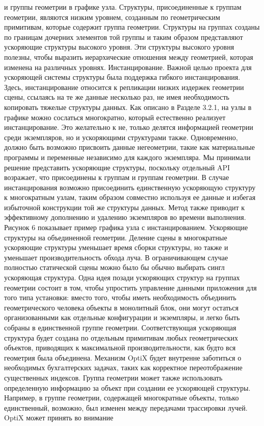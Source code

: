 и группы геометрии в графике узла. Структуры, присоединенные к группам геометрии, являются низким уровнем, созданным по геометрическим примитивам, которые содержит группа геометрии. Структуры на группах созданы по границам дочерних элементов той группы и таким образом представляют ускоряющие структуры высокого уровня. Эти структуры высокого уровня полезны, чтобы выразить иерархические отношения между геометрией, которая изменена на различных уровнях. Инстанцирование. Важной целью проекта для ускоряющей системы структуры была поддержка гибкого инстанцирования. Здесь, инстанцирование относится к репликации низких издержек геометрии сцены, ссылаясь на те же данные несколько раз, не имея необходимость копировать тяжелые структуры данных. Как описано в Разделе 3.2.1, на узлы в графике можно сослаться многократно, который естественно реализует инстанцирование. Это желательно к не, только делятся информацией геометрии среди экземпляров, но и ускоряющими структурами также. Одновременно, должно быть возможно присвоить данные негеометрии, такие как материальные программы и переменные независимо для каждого экземпляра. Мы принимали решение представить ускоряющие структуры, поскольку отдельный API возражает, что присоединены к группам и группам геометрии. В случае инстанцирования возможно присоединить единственную ускоряющую структуру к многократным узлам, таким образом совместно используя ее данные и избегая избыточной конструкции той же структуры данных. Метод также приводит к эффективному дополнению и удалению экземпляров во времени выполнения. Рисунок 6 показывает пример графика узла с инстанцированием.
Ускоряющие структуры на объединенной геометрии. Деление сцены в многократные ускоряющие структуры уменьшает время сборки структуры, но также и уменьшает производительность обхода луча. В ограничивающем случае полностью статической сцены можно было бы обычно выбирать сингл
ускоряющая структура. Одна идея позади ускоряющих структур на группах геометрии состоит в том, чтобы упростить управление данными приложения для того типа установки: вместо того, чтобы иметь необходимость объединить геометрического человека
объекты в монолитный блок, они могут остаться организованными как отдельные конфигурации и экземпляры, и легко быть собраны в единственной группе геометрии. Соответствующая ускоряющая структура будет создана по отдельным примитивам любых геометрических объектов, приводящих к максимальной производительности, как будто вся геометрия была объединена.
Механизм OptiX будет внутренне заботиться о необходимых бухгалтерских задачах, таких как корректное переотображение существенных индексов. Группа геометрии может также использовать определенную информацию за объект при создании ее ускоряющей структуры. Например, в группе геометрии, содержащей многократные объекты, только единственный, возможно, был изменен между передачами трассировки лучей. OptiX может принять во внимание
